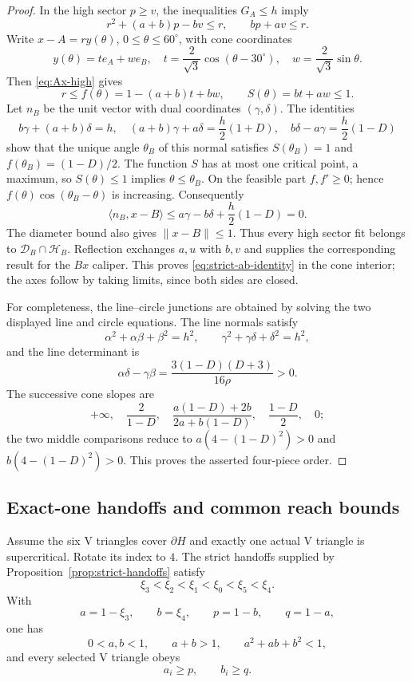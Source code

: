 \begin{proof}
In the high sector $p\ge v$, the inequalities $G_A\le h$ imply
\begin{equation}
 r^2+(a+b)p-bv\le r,\qquad bp+av\le r.          \label{eq:Ax-high}
\end{equation}
Write $x-A=ry(\theta)$, $0\le\theta\le60^\circ$, with cone coordinates
\[
 y(\theta)=te_A+we_B,\quad
 t=\frac2{\sqrt3}\cos(\theta-30^\circ),\quad
 w=\frac2{\sqrt3}\sin\theta.
\]
Then \eqref{eq:Ax-high} gives
\[
 r\le f(\theta)=1-(a+b)t+bw,\qquad S(\theta)=bt+aw\le1.
\]
Let $n_B$ be the unit vector with dual coordinates $(\gamma,\delta)$.
The identities
\[
 b\gamma+(a+b)\delta=h,\quad
 (a+b)\gamma+a\delta=\frac h2(1+D),\quad
 b\delta-a\gamma=\frac h2(1-D)
\]
show that the unique angle $\theta_B$ of this normal satisfies
$S(\theta_B)=1$ and $f(\theta_B)=(1-D)/2$.  The function $S$ has at most
one critical point, a maximum, so $S(\theta)\le1$ implies
$\theta\le\theta_B$.  On the feasible part $f,f'\ge0$; hence
$f(\theta)\cos(\theta_B-\theta)$ is increasing.  Consequently
\[
 \langle n_B,x-B\rangle
 \le a\gamma-b\delta+\frac h2(1-D)=0.
\]
The diameter bound also gives $\lVert x-B\rVert\le1$.  Thus every high
sector fit belongs to $\mathcal D_B\cap\mathcal H_B$.  Reflection exchanges
$a,u$ with $b,v$ and supplies the corresponding result for the $Bx$
caliper.  This proves \eqref{eq:strict-ab-identity} in the cone interior;
the axes follow by taking limits, since both sides are closed.

For completeness, the line--circle junctions are obtained by solving the
two displayed line and circle equations.  The line normals satisfy
\[
 \alpha^2+\alpha\beta+\beta^2=h^2,\qquad
 \gamma^2+\gamma\delta+\delta^2=h^2,
\]
and the line determinant is
\[
 \alpha\delta-\gamma\beta
 =\frac{3(1-D)(D+3)}{16\rho}>0.
\]
The successive cone slopes are
\[
 +\infty,\quad \frac2{1-D},\quad
 \frac{a(1-D)+2b}{2a+b(1-D)},\quad
 \frac{1-D}{2},\quad0;
\]
the two middle comparisons reduce to
$a(4-(1-D)^2)>0$ and $b(4-(1-D)^2)>0$.  This proves the asserted four-piece
order.
\end{proof}

\subsection{Exact-one handoffs and common reach bounds}

\begin{lemma}
\label{lem:ab-extreme-jump}
Assume the six V triangles cover $\partial H$ and exactly one actual V triangle is
supercritical.  Rotate its index to $4$.  The strict handoffs supplied by
Proposition~\ref{prop:strict-handoffs} satisfy
\[
 \xi_3<\xi_2<\xi_1<\xi_0<\xi_5<\xi_4.                       \label{eq:extreme-chain}
\]
With
\[
 a=1-\xi_3,\qquad b=\xi_4,\qquad p=1-b,\qquad q=1-a,
\]
one has
\begin{equation}
 0<a,b<1,\qquad a+b>1,\qquad a^2+ab+b^2<1,       \label{eq:ab-strict-domain}
\end{equation}
and every selected V triangle obeys
\[
 a_i\ge p,\qquad b_i\ge q.
\]
\end{lemma}

